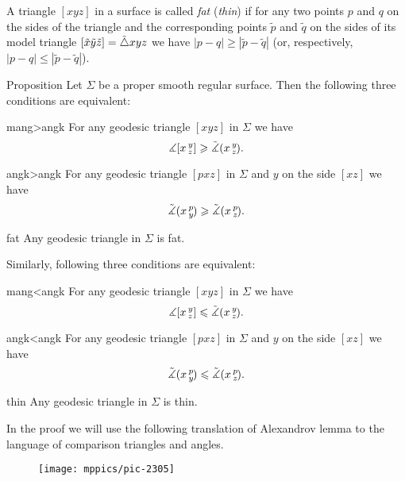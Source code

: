 A triangle $[xyz]$ in a surface is called \emph{fat} (\emph{thin})
if for any two points $p$ and $q$ on the sides of the triangle and the corresponding points 
$\tilde p$ and $\tilde q$ on the sides of its model triangle $[\tilde x\tilde y\tilde z]\z=\tilde\triangle xyz$ we have
$|p-q|\ge |\tilde p-\tilde q|$ (or, respectively, $|p-q|\le |\tilde p-\tilde q|$).


\begin{thm}{Proposition}\label{prop:comp-reformulations}
Let $\Sigma$ be a proper smooth regular surface.
Then the following three conditions are equivalent:

\begin{subthm}{mang>angk}
For any geodesic triangle $[xyz]$ in $\Sigma$ we have
 \[\measuredangle[x\,{}^{y}_{z}]\geqslant\tilde\measuredangle(x\,{}^{y}_{z}\hspace{-0.2ex}).\]
\end{subthm}

\begin{subthm}{angk>angk} For any geodesic triangle $[pxz]$ in $\Sigma$ and $y$ on the side $[xz]$ we have
 \[\tilde\measuredangle(x\,{}^{p}_{y}\hspace{-0.2ex}) \geqslant \tilde\measuredangle(x\,{}^{p}_{z}\hspace{-0.2ex}).\]
 
\end{subthm}

\begin{subthm}{fat}
 Any geodesic triangle in $\Sigma$ is fat.
\end{subthm}


\medskip

Similarly, following three conditions are equivalent:

\begin{subthmA}{mang<angk}
For any geodesic triangle $[xyz]$ in $\Sigma$ we have
 \[\measuredangle[x\,{}^{y}_{z}]\leqslant\tilde\measuredangle(x\,{}^{y}_{z}\hspace{-0.2ex}).\]
\end{subthmA}

\begin{subthmA}{angk<angk} For any geodesic triangle $[pxz]$ in $\Sigma$ and $y$ on the side $[xz]$ we have
 \[\tilde\measuredangle(x\,{}^{p}_{y}\hspace{-0.2ex}) \leqslant \tilde\measuredangle(x\,{}^{p}_{z}\hspace{-0.2ex}).\]
\end{subthmA}

\begin{subthmA}{thin}
Any geodesic triangle in $\Sigma$ is thin.
\end{subthmA}

\end{thm}

In the proof we will use the following translation of Alexandrov lemma to the language of comparison triangles and angles.

\begin{wrapfigure}{r}{25mm}
\vskip-0mm
\centering
\texttt{[image: mppics/pic-2305]}
\end{wrapfigure}

